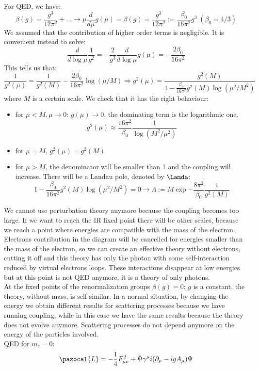 \documentclass[../main.tex]{subfiles}
\begin{document}
For QED, we have:
\[
\beta(g)=\frac{g^3}{12\pi^2}+\dots\xrightarrow[]{}\mu\frac{d}{d\mu}g(\mu)=\beta(g)=\frac{g^3}{12\pi^2}:=\frac{\beta_0}{16\pi^2}g^3\;(\beta_0=4/3)
\]
We assumed that the contribution of higher order terms is negligible. It is convenient instead to solve:
\[
\frac{d}{d\log\mu}\frac{1}{g^2}=-\frac{2}{g^3}\frac{d}{d\log\mu}g(\mu)=-\frac{2\beta_0}{16\pi^2}
\]
This tells us that:
\[
\frac{1}{g^2(\mu)}=\frac{1}{g^2(M)}-\frac{2\beta_0}{16\pi^2}\log(\mu/M)\Rightarrow g^2(\mu)=\frac{g^2(M)}{1-\frac{\beta_0}{16\pi^2}g^2(M)\log(\mu^2/M^2)}
\]
where $M$ is a certain scale. We check that it has the right behaviour:
\begin{itemize}
    \item for $\mu<M, \mu\to0$: $g(\mu)\to0$, the dominating term is the logarithmic one.
    \[
    g^2(\mu)\approx\frac{16\pi^2}{\beta_0}\frac{1}{\log(M^2/\mu^2)}
    \]
    \item for $\mu=M$, $g^2(\mu)=g^2(M)$
    \item for $\mu>M$, the denominator will be smaller than 1 and the coupling will increase. There will be a Landau pole, denoted by $\Lamda$:
    \[
    1-\frac{\beta_0}{16\pi^2}g^2(M)\log(\mu^2/M^2)=0\to\Lambda:=M\exp{-\frac{8\pi^2}{\beta_0}\frac{1}{g^2(M)}}
    \]
\end{itemize}
We cannot use perturbation theory anymore because the coupling becomes too large. If we want to reach the IR fixed point there will be other scales, because we reach a point where energies are compatible with the mass of the electron. Electrons contribution in the diagram will be cancelled for energies smaller than the mass of the electron, so we can create an effective theory without electrons, cutting it off and this theory has only the photon with some self-interaction reduced by virtual electrons loops. These interactions disappear at low energies but at this point is not QED anymore, it is a theory of only photons.\\
At the fixed points of the renormalization groups $\beta(g)=0$: $g$ is a constant, the theory, without mass, is self-similar. In a normal situation, by changing the energy we obtain different results for scattering processes because we have running coupling, while in this case we have the same results because the theory does not evolve anymore. Scattering processes do not depend anymore on the energy of the particles involved.\\
\underline{QED for $m_e=0$}:
\[
\pazocal{L}=-\frac{1}{4}F_{\mu\nu}^2+\Bar{\Psi}\gamma^\mu i(\partial_\mu-igA_\mu)\Psi
\]
\end{document}
